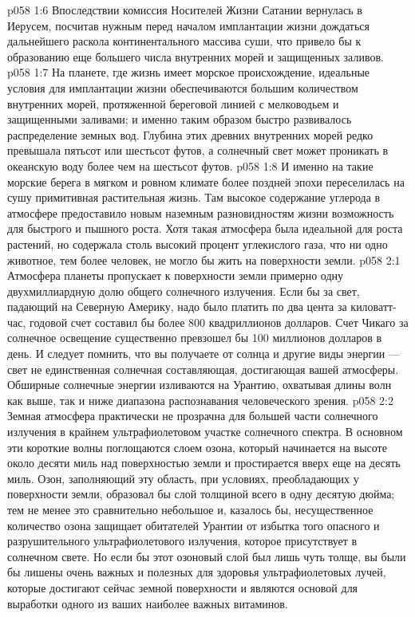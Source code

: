 \vs p058 1:6 Впоследствии комиссия Носителей Жизни Сатании вернулась в Иерусем, посчитав нужным перед началом имплантации жизни дождаться дальнейшего раскола континентального массива суши, что привело бы к образованию еще большего числа внутренних морей и защищенных заливов.
\vs p058 1:7 \pc На планете, где жизнь имеет морское происхождение, идеальные условия для имплантации жизни обеспечиваются большим количеством внутренних морей, протяженной береговой линией с мелководьем и защищенными заливами; и именно таким образом быстро развивалось распределение земных вод. Глубина этих древних внутренних морей редко превышала пятьсот или шестьсот футов, а солнечный свет может проникать в океанскую воду более чем на шестьсот футов.
\vs p058 1:8 И именно на такие морские берега в мягком и ровном климате более поздней эпохи переселилась на сушу примитивная растительная жизнь. Там высокое содержание углерода в атмосфере предоставило новым наземным разновидностям жизни возможность для быстрого и пышного роста. Хотя такая атмосфера была идеальной для роста растений, но содержала столь высокий процент углекислого газа, что ни одно животное, тем более человек, не могло бы жить на поверхности земли.
\vs p058 2:1 Атмосфера планеты пропускает к поверхности земли примерно одну двухмиллиардную долю общего солнечного излучения. Если бы за свет, падающий на Северную Америку, надо было платить по два цента за киловатт\hyp{}час, годовой счет составил бы более 800 квадриллионов долларов. Счет Чикаго за солнечное освещение существенно превзошел бы 100 миллионов долларов в день. И следует помнить, что вы получаете от солнца и другие виды энергии --- свет не единственная солнечная составляющая, достигающая вашей атмосферы. Обширные солнечные энергии изливаются на Урантию, охватывая длины волн как выше, так и ниже диапазона распознавания человеческого зрения.
\vs p058 2:2 \pc Земная атмосфера практически не прозрачна для большей части солнечного излучения в крайнем ультрафиолетовом участке солнечного спектра. В основном эти короткие волны поглощаются слоем озона, который начинается на высоте около десяти миль над поверхностью земли и простирается вверх еще на десять миль. Озон, заполняющий эту область, при условиях, преобладающих у поверхности земли, образовал бы слой толщиной всего в одну десятую дюйма; тем не менее это сравнительно небольшое и, казалось бы, несущественное количество озона защищает обитателей Урантии от избытка того опасного и разрушительного ультрафиолетового излучения, которое присутствует в солнечном свете. Но если бы этот озоновый слой был лишь чуть толще, вы были бы лишены очень важных и полезных для здоровья ультрафиолетовых лучей, которые достигают сейчас земной поверхности и являются основой для выработки одного из ваших наиболее важных витаминов.
